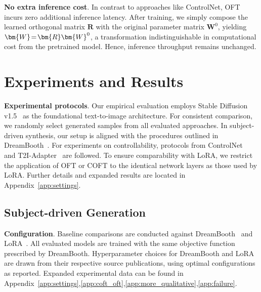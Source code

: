 \textbf{No extra inference cost}. In contrast to approaches like ControlNet, OFT incurs zero additional inference latency. After training, we simply compose the learned orthogonal matrix $\bm{R}$ with the original parameter matrix $\bm{W}^0$, yielding $\thickmuskip=2mu \medmuskip=2mu \bm{W}=\bm{R}\bm{W}^0$, a transformation indistinguishable in computational cost from the pretrained model. Hence, inference throughput remains unchanged.

\section{Experiments and Results}

\textbf{Experimental protocols}. Our empirical evaluation employs Stable Diffusion v1.5~\cite{rombach2022high} as the foundational text-to-image architecture. For consistent comparison, we randomly select generated samples from all evaluated approaches. In subject-driven synthesis, our setup is aligned with the procedures outlined in DreamBooth~\cite{ruiz2023dreambooth}. For experiments on controllability, protocols from ControlNet~\cite{zhang2023adding} and T2I-Adapter~\cite{mou2023t2i} are followed. To ensure comparability with LoRA, we restrict the application of OFT or COFT to the identical network layers as those used by LoRA. Further details and expanded results are located in Appendix~\ref{app:settings}.

\subsection{Subject-driven Generation}

\textbf{Configuration}. Baseline comparisons are conducted against DreamBooth~\cite{ruiz2023dreambooth} and LoRA~\cite{hulora2022}. All evaluated models are trained with the same objective function prescribed by DreamBooth. Hyperparameter choices for DreamBooth and LoRA are drawn from their respective source publications, using optimal configurations as reported. Expanded experimental data can be found in Appendix~\ref{app:settings},\ref{app:coft_oft},\ref{app:more_qualitative},\ref{app:failure}.

